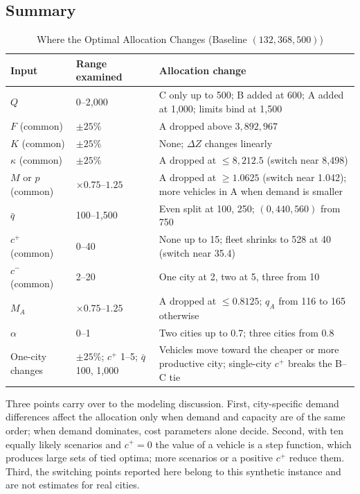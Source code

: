 \documentclass[10pt,a4paper]{article}
\begin{document}
\subsection{Summary}
\begin{table}[H]
\centering\small
\caption{Where the Optimal Allocation Changes (Baseline $(132,368,500)$)}\label{tab:an-summary}
\begin{tabular}{lP{.30\linewidth}P{.44\linewidth}}
\toprule
Input & Range examined & Allocation change\\\midrule
$Q$ & 0--2{,}000 & C only up to 500; B added at 600; A added at 1{,}000; limits bind at 1{,}500\\
$F$ (common) & $\pm25\%$ & A dropped above $3{,}892{,}967$\\
$K$ (common) & $\pm25\%$ & None; $\Delta Z$ changes linearly\\
$\kappa$ (common) & $\pm25\%$ & A dropped at $\le8{,}212.5$ (switch near 8{,}498)\\
$M$ or $p$ (common) & $\times0.75$--$1.25$ & A dropped at $\ge1.0625$ (switch near 1.042); more vehicles in A when demand is smaller\\
$\bar q$ & 100--1{,}500 & Even split at 100, 250; $(0,440,560)$ from 750\\
$c^+$ (common) & 0--40 & None up to 15; fleet shrinks to 528 at 40 (switch near 35.4)\\
$c^-$ (common) & 2--20 & One city at 2, two at 5, three from 10\\
$M_A$ & $\times0.75$--$1.25$ & A dropped at $\le0.8125$; $q_A$ from 116 to 165 otherwise\\
$\alpha$ & 0--1 & Two cities up to 0.7; three cities from 0.8\\
One-city changes & $\pm25\%$; $c^+$ 1--5; $\bar q$ 100, 1{,}000 & Vehicles move toward the cheaper or more productive city; single-city $c^+$ breaks the B--C tie\\
\bottomrule
\end{tabular}
\end{table}
Three points carry over to the modeling discussion. First, city-specific demand differences affect the allocation only when demand and capacity are of the same order; when demand dominates, cost parameters alone decide.
Second, with ten equally likely scenarios and $c^+=0$ the value of a vehicle is a step function, which produces large sets of tied optima; more scenarios or a positive $c^+$ reduce them.
Third, the switching points reported here belong to this synthetic instance and are not estimates for real cities.
\end{document}
